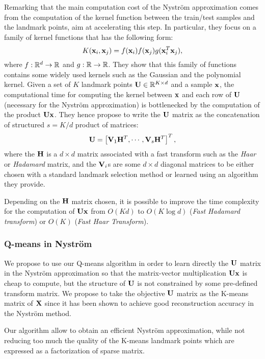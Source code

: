 Remarking that the main computation cost of the Nyström approximation comes from the computation of the kernel function between the train/test samples and the landmark points, \cite{si2016computationally} aim at accelerating this step. In particular, they focus on a family of kernel functions that has the following form:
%
\begin{equation}
 K({\mathbf{x}}_i, {\mathbf{x}}_j) = f({\mathbf{x}}_i) f({\mathbf{x}}_j) g({\mathbf{x}}_i^T{\mathbf{x}}_j),
\end{equation}
%
where $f: \mathbb{R}^d \rightarrow \mathbb{R}$ and $g: \mathbb{R} \rightarrow \mathbb{R}$. They show that this family of functions contains some widely used kernels such as the Gaussian and the polynomial kernel. Given a set of $K$ landmark points ${\mathbf{U}} \in \mathbb{R}^{K \times d}$ and a sample ${\mathbf{x}}$, the computational time for computing the kernel between ${\mathbf{x}}$ and each row of ${\mathbf{U}}$ (necessary for the Nyström approximation) is bottlenecked by the computation of the product ${\mathbf{U}}{\mathbf{x}}$. They hence propose to write the ${\mathbf{U}}$ matrix as the concatenation of structured $s = K / d$ product of matrices:
%
\begin{equation}
 {\mathbf{U}} = \left[ {\mathbf{V}}_1 {\mathbf{H}}^T, \cdots, {\mathbf{V}}_s{\mathbf{H}}^T  \right]^T,
\end{equation}
%
where the ${\mathbf{H}}$ is a $d \times d$ matrix associated with a fast transform such as the \textit{Haar} or \textit{Hadamard} matrix, and the ${\mathbf{V}}_i$s are some $d \times d$ diagonal matrices to be either chosen with a standard landmark selection method or learned using an algorithm they provide.

Depending on the ${\mathbf{H}}$ matrix chosen, it is possible to improve the time complexity for the computation of ${\mathbf{U}}{\mathbf{x}}$ from $O(Kd)$ to $O(K \log{d})$ (\textit{Fast Hadamard transform}) or $O(K)$ (\textit{Fast Haar Transform}).

\subsubsection{Q-means in Nyström}

We propose to use our Q-means algorithm in order to learn directly the ${\mathbf{U}}$ matrix in the Nyström approximation so that the matrix-vector multiplication ${\mathbf{U}} {\mathbf{x}}$ is cheap to compute, but the structure of ${\mathbf{U}}$ is not constrained by some pre-defined transform matrix. We propose to take the objective ${\mathbf{U}}$ matrix as the K-means matrix of ${\mathbf{X}}$ since it has been shown to achieve good reconstruction accuracy in the Nyström method.

Our algorithm allow to obtain an efficient Nyström approximation, while not reducing too much the quality of the K-means landmark points which are expressed as a factorization of sparse matrix. 

